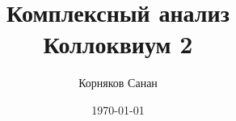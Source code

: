 \documentclass[a4paper, 12pt]{article}
\title{\textbf{Комплексный анализ} \\
	\large \vspace{10cm}\textbf{Коллоквиум 2}}
\date{\vspace{10cm}\today}
\author{Корняков Санан}
\affil{БПМИ223}
\begin{document}
\renewcommand{\contentsname}{Оглавление}
\maketitle
\newpage
\tableofcontents

\end{document}
